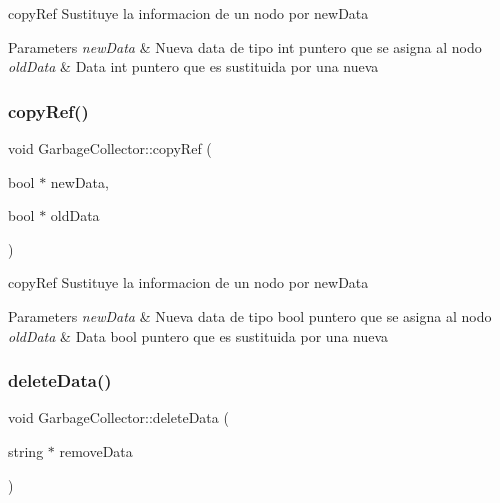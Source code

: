 copy\+Ref Sustituye la informacion de un nodo por new\+Data 


\begin{DoxyParams}{Parameters}
{\em new\+Data} & Nueva data de tipo int puntero que se asigna al nodo \\
\hline
{\em old\+Data} & Data int puntero que es sustituida por una nueva \\
\hline
\end{DoxyParams}
\mbox{\label{class_garbage_collector_ade1e5043ec482abdf97d7a3c0fcaa5d0}} 
\subsubsection{\texorpdfstring{copy\+Ref()}{copyRef()}\hspace{0.1cm}{\footnotesize\ttfamily [3/3]}}
{\footnotesize\ttfamily void Garbage\+Collector\+::copy\+Ref (\begin{DoxyParamCaption}\item[{bool $\ast$}]{new\+Data,  }\item[{bool $\ast$}]{old\+Data }\end{DoxyParamCaption})}



copy\+Ref Sustituye la informacion de un nodo por new\+Data 


\begin{DoxyParams}{Parameters}
{\em new\+Data} & Nueva data de tipo bool puntero que se asigna al nodo \\
\hline
{\em old\+Data} & Data bool puntero que es sustituida por una nueva \\
\hline
\end{DoxyParams}
\mbox{\label{class_garbage_collector_a6e3a72d5b91b1d5c8d2985b449720c6f}} 
\subsubsection{\texorpdfstring{delete\+Data()}{deleteData()}\hspace{0.1cm}{\footnotesize\ttfamily [1/3]}}
{\footnotesize\ttfamily void Garbage\+Collector\+::delete\+Data (\begin{DoxyParamCaption}\item[{string $\ast$}]{remove\+Data }\end{DoxyParamCaption})}



